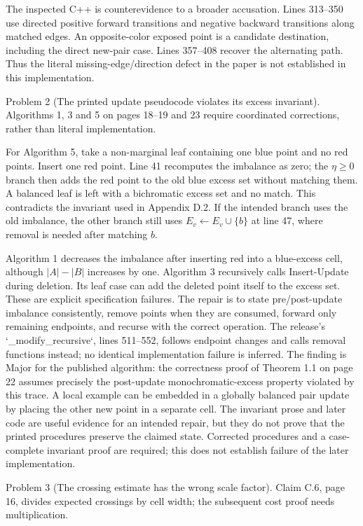 \documentclass[10pt]{article}
\begin{document}
The inspected C++ is counterevidence to a broader accusation. Lines 313–350 use directed positive forward transitions and negative backward transitions along matched edges. An opposite-color exposed point is a candidate destination, including the direct new-pair case. Lines 357–408 recover the alternating path. Thus the literal missing-edge/direction defect in the paper is not established in this implementation.\par
Problem 2 (The printed update pseudocode violates its excess invariant).  Algorithms 1, 3 and 5 on pages 18–19 and 23 require coordinated corrections, rather than literal implementation.\par
For Algorithm 5, take a non-marginal leaf containing one blue point and no red points. Insert one red point. Line 41 recomputes the imbalance as zero; the \(\eta\geq0\) branch then adds the red point to the old blue excess set without matching them. A balanced leaf is left with a bichromatic excess set and no match. This contradicts the invariant used in Appendix D.2. If the intended branch uses the old imbalance, the other branch still uses \(E_v\leftarrow E_v\cup\{b\}\) at line 47, where removal is needed after matching \(b\).\par
Algorithm 1 decreases the imbalance after inserting red into a blue-excess cell, although \(|A|-|B|\) increases by one. Algorithm 3 recursively calls Insert-Update during deletion. Its leaf case can add the deleted point itself to the excess set. These are explicit specification failures. The repair is to state pre/post-update imbalance consistently, remove points when they are consumed, forward only remaining endpoints, and recurse with the correct operation. The release’s `\_modify\_recursive`, lines 511–552, follows endpoint changes and calls removal functions instead; no identical implementation failure is inferred. The finding is Major for the published algorithm: the correctness proof of Theorem 1.1 on page 22 assumes precisely the post-update monochromatic-excess property violated by this trace. A local example can be embedded in a globally balanced pair update by placing the other new point in a separate cell. The invariant prose and later code are useful evidence for an intended repair, but they do not prove that the printed procedures preserve the claimed state. Corrected procedures and a case-complete invariant proof are required; this does not establish failure of the later implementation.\par
Problem 3 (The crossing estimate has the wrong scale factor).  Claim C.6, page 16, divides expected crossings by cell width; the subsequent cost proof needs multiplication.\par
\end{document}
